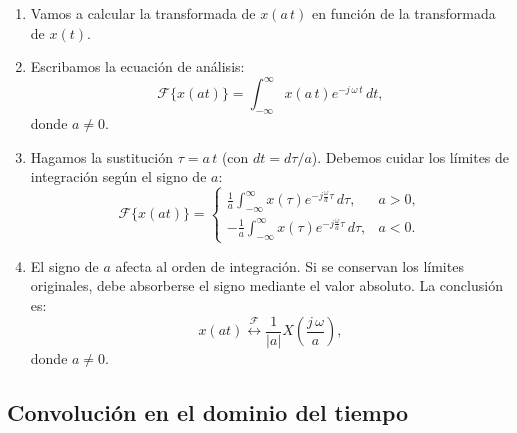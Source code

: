 \documentclass[11pt,a4paper,openany]{book}
\begin{document}
\begin{enumerate}
	
	\item Vamos a calcular la transformada de $x(a \, t)$ en función de la transformada de $x(t)$.
	\item Escribamos la ecuación de análisis:
	\begin{equation}
		\mathcal{F}\{x(at)\} = \int_{-\infty}^{\infty} x(a \, t) e^{-j \, \omega \, t} \, dt,
	\end{equation}
	donde $a \neq 0$. 
	
	\item Hagamos la sustitución $\tau = a \, t$ (con $dt = d\tau / a$). Debemos cuidar los límites de integración según el signo de $a$:
	\begin{equation}
		\mathcal{F}\{x(at)\} = \begin{cases}
			\frac{1}{a} \int_{-\infty}^{\infty} x(\tau) e^{-j \frac{\omega}{a} \tau} \, d\tau , & a > 0, \\ 
			-\frac{1}{a} \int_{-\infty}^{\infty} x(\tau) e^{-j \frac{\omega}{a} \tau} \, d\tau , & a < 0.
		\end{cases}
	\end{equation}
	
	\item El signo de $a$ afecta al orden de integración. Si se conservan los límites originales, debe absorberse el signo mediante el valor absoluto. La conclusión es:
	\begin{equation}
		x(at) \stackrel{\mathcal{F}}{\longleftrightarrow} \frac{1}{|a|} X\left( \frac{j \, \omega}{a} \right) ,
	\end{equation}
	donde $a \neq 0$.
	
\end{enumerate}

\subsection{Convolución en el dominio del tiempo}
\end{document}
